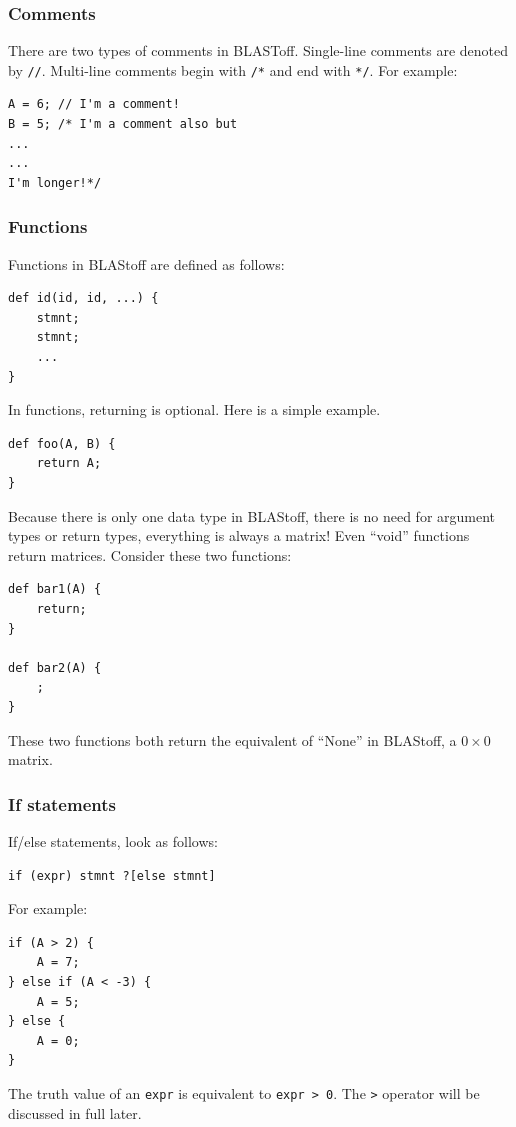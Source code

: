 \subsubsection{Comments}
There are two types of comments in BLASToff.  Single-line comments are denoted by \verb=//=.  Multi-line comments begin with  \verb=/*= and end with \verb=*/=.  For example:
\begin{lstlisting}
A = 6; // I'm a comment!
B = 5; /* I'm a comment also but
...
...
I'm longer!*/
\end{lstlisting}

\subsubsection{Functions}
Functions in BLAStoff are defined as follows:\begin{lstlisting}
def id(id, id, ...) {
    stmnt;
    stmnt;
    ...
}
\end{lstlisting}
In functions, returning is optional.  Here is a simple example.
\begin{lstlisting}
def foo(A, B) {
    return A;
}
\end{lstlisting}
Because there is only one data type in BLAStoff, there is no need for argument types or return types, everything is always a matrix!  Even ``void'' functions return matrices.  Consider these two functions:

\begin{lstlisting}
def bar1(A) {
    return;
}

def bar2(A) {
    ;
}
\end{lstlisting}
These two functions both return the equivalent of ``None'' in BLAStoff, a $0\times 0$ matrix.

\subsubsection{If statements}
If/else statements, look as follows:
\begin{lstlisting}
if (expr) stmnt ?[else stmnt]
\end{lstlisting}

For example:
\begin{lstlisting}
if (A > 2) {
    A = 7;
} else if (A < -3) {
    A = 5;
} else {
    A = 0;
}
\end{lstlisting}

The truth value of an \verb=expr= is equivalent to \verb=expr > 0=.  The \verb=>= operator will be discussed in full later.

